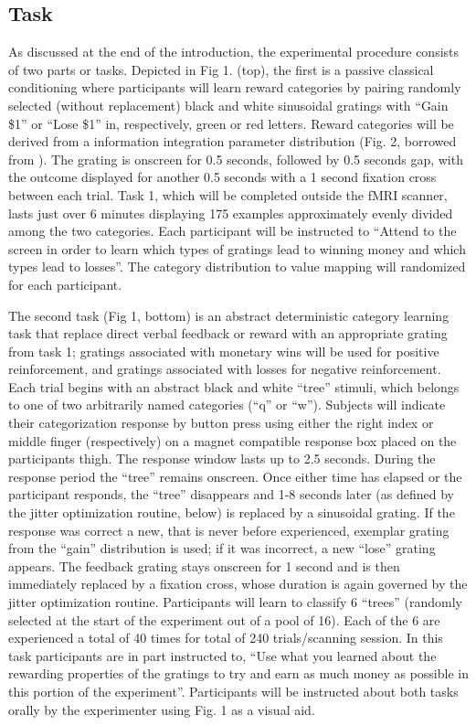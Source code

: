 \documentclass[doc,12pt]{apa}        %
\begin{document}
\subsection{Task} %
\label{sub:task}
As discussed at the end of the introduction, the experimental procedure consists of two parts or tasks.  Depicted in Fig 1. (top), the first is a passive classical conditioning where participants will learn reward categories by pairing randomly selected (without replacement) black and white sinusoidal gratings with ``Gain \$1'' or ``Lose \$1'' in, respectively, green or red letters.  Reward categories will be derived from a information integration parameter distribution (Fig. 2, borrowed from \cite{Spiering:2008p5008}).  The grating is onscreen for 0.5 seconds, followed by 0.5 seconds gap, with the outcome displayed for another 0.5 seconds with a 1 second fixation cross between each trial. Task 1, which will be completed outside the fMRI scanner, lasts just over 6 minutes displaying 175 examples approximately evenly divided among the two categories.  Each participant will be instructed to ``Attend to the screen in order to learn which types of gratings lead to winning money and which types lead to losses''.  The category distribution to value mapping will randomized for each participant.

The second task (Fig 1, bottom) is an abstract deterministic category learning task that replace direct verbal feedback or reward with an appropriate grating from task 1; gratings associated with monetary wins will be used for positive reinforcement, and gratings associated with losses for negative reinforcement.   Each trial begins with an abstract black and white ``tree'' stimuli, which belongs to one of two arbitrarily named categories (``q'' or ``w'').  Subjects will indicate their categorization response by button press using either the right index or middle finger (respectively) on a magnet compatible response box placed on the participants thigh.  The response window lasts up to 2.5 seconds.  During the response period the ``tree'' remains onscreen.  Once either time has elapsed or the participant responds, the ``tree'' disappears and 1-8 seconds later (as defined by the jitter optimization routine, below) is replaced by a sinusoidal grating.  If the response was correct a new, that is never before experienced, exemplar grating from the ``gain'' distribution is used; if it was incorrect, a new ``lose'' grating appears.  The feedback grating stays onscreen for 1 second and is then immediately replaced by a fixation cross, whose duration is again governed by the jitter optimization routine.  Participants will learn to classify 6 ``trees'' (randomly selected at the start of the experiment out of a pool of 16). Each of the 6 are experienced a total of 40 times for total of 240 trials/scanning session. In this task participants are in part instructed to, ``Use what you learned about the rewarding properties of the gratings to try and earn as much money as possible in this portion of the experiment''.  Participants will be instructed about both tasks orally by the experimenter using Fig. 1 as a visual aid.
\end{document}

